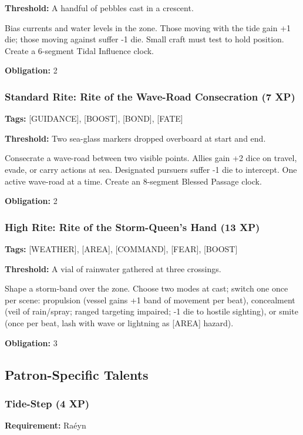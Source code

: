 \textbf{Threshold:} A handful of pebbles cast in a crescent.

Bias currents and water levels in the zone. Those moving with the tide gain +1 die; those moving against suffer -1 die. Small craft must test to hold position. Create a 6-segment Tidal Influence clock.

\textbf{Obligation:} 2

\subsubsection{Standard Rite: Rite of the Wave-Road Consecration (7 XP)}

\textbf{Tags:} [GUIDANCE], [BOOST], [BOND], [FATE]

\textbf{Threshold:} Two sea-glass markers dropped overboard at start and end.

Consecrate a wave-road between two visible points. Allies gain +2 dice on travel, evade, or carry actions at sea. Designated pursuers suffer -1 die to intercept. One active wave-road at a time. Create an 8-segment Blessed Passage clock.

\textbf{Obligation:} 2

\subsubsection{High Rite: Rite of the Storm-Queen's Hand (13 XP)}

\textbf{Tags:} [WEATHER], [AREA], [COMMAND], [FEAR], [BOOST]

\textbf{Threshold:} A vial of rainwater gathered at three crossings.

Shape a storm-band over the zone. Choose two modes at cast; switch one once per scene: propulsion (vessel gains +1 band of movement per beat), concealment (veil of rain/spray; ranged targeting impaired; -1 die to hostile sighting), or smite (once per beat, lash with wave or lightning as [AREA] hazard).

\textbf{Obligation:} 3

\subsection{Patron-Specific Talents}

\subsubsection{Tide-Step (4 XP)}

\textbf{Requirement:} Raéyn

